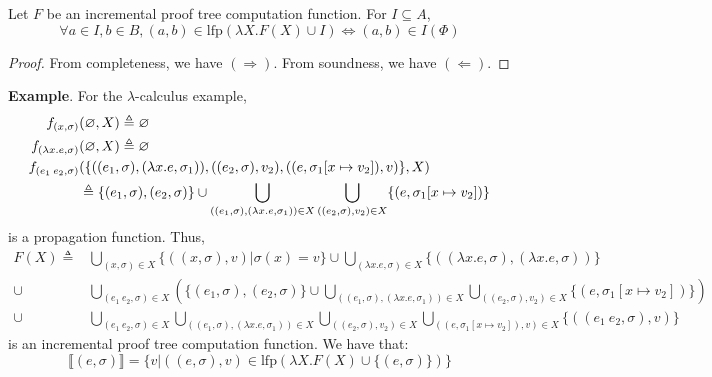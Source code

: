 \documentclass[12pt]{article}
\begin{document}
\begin{corollary}
	Let $F$ be an incremental proof tree computation function.
	For $I\subseteq A$,
	\[\forall a\in I, b\in B, (a,b)\in\text{lfp}(\lambda X.F(X)\cup I)\Leftrightarrow (a,b)\in I(\Phi)\]
\end{corollary}
\begin{proof}
	From completeness, we have $(\Rightarrow)$. From soundness, we have $(\Leftarrow)$.
\end{proof}
\noindent\textbf{Example}. For the $\lambda$-calculus example,
\begin{align*}
	f_{(x,\sigma)}           & (\varnothing,X)\triangleq\varnothing                                                                                                                           \\
	f_{(\lambda x.e,\sigma)} & (\varnothing,X)\triangleq\varnothing                                                                                                                           \\
	f_{(e_1\:e_2,\sigma)}    & (\{((e_1,\sigma),(\lambda x.e,\sigma_1)),((e_2,\sigma),v_2),((e,\sigma_1[x\mapsto v_2]),v)\},X)                                                            \\
	                         & \triangleq\{(e_1,\sigma),(e_2,\sigma)\}\cup\bigcup_{((e_1,\sigma),(\lambda x.e,\sigma_1))\in X}\bigcup_{((e_2,\sigma),v_2)\in X}\{(e,\sigma_1[x\mapsto v_2])\}
\end{align*}
is a propagation function. Thus,
\begin{align*}
	F(X)\triangleq & \bigcup_{(x,\sigma)\in X}\{((x,\sigma),v)|\sigma(x)=v\}\cup\bigcup_{(\lambda x.e,\sigma)\in X}\{((\lambda x.e,\sigma),(\lambda x.e,\sigma))\}                                                     \\
	\cup           & \bigcup_{(e_1\:e_2,\sigma)\in X}\left(\{(e_1,\sigma),(e_2,\sigma)\}\cup\bigcup_{((e_1,\sigma),(\lambda x.e,\sigma_1))\in X}\bigcup_{((e_2,\sigma),v_2)\in X}\{(e,\sigma_1[x\mapsto v_2])\}\right) \\
	\cup           & \bigcup_{(e_1\:e_2,\sigma)\in X}\bigcup_{((e_1,\sigma),(\lambda x.e,\sigma_1))\in X}\bigcup_{((e_2,\sigma),v_2)\in X}\bigcup_{((e,\sigma_1[x\mapsto v_2]),v)\in X}\{((e_1\:e_2,\sigma),v)\}
\end{align*}
is an incremental proof tree computation function. We have that:
\[\lBrack(e,\sigma)\rBrack=\{v|((e,\sigma),v)\in\text{lfp}(\lambda X.F(X)\cup\{(e,\sigma)\})\}\]


\nocite{*}
\end{document}
